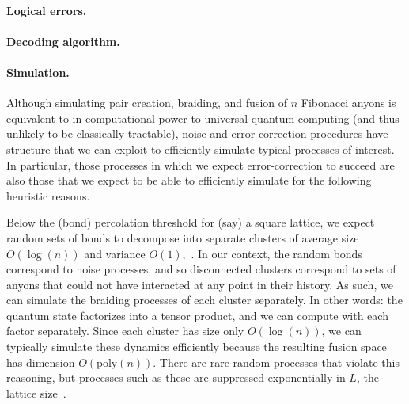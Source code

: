 \documentclass[aps, prl, letterpaper, twocolumn, superscriptaddress, notitlepage]{revtex4-1}
\begin{document}

\paragraph{Logical errors.}


\paragraph{Decoding algorithm.}



\paragraph{Simulation.}

Although simulating pair creation, braiding, and fusion of $n$ Fibonacci anyons is equivalent 
to in computational power to universal quantum computing (and thus unlikely to be classically 
tractable), noise and error-correction procedures have structure that we can exploit to 
efficiently simulate typical processes of interest. In particular, those processes in which we 
expect error-correction to succeed are also those that we expect to be able to efficiently 
simulate for the following heuristic reasons.

Below the (bond) percolation threshold for (say) a square lattice, we expect random sets of 
bonds to decompose into separate clusters of average size $O(\log(n))$ and variance 
$O(1)$,~\cite{Bazant2000}. In our context, the random bonds correspond to noise processes, 
and so disconnected clusters correspond to sets of anyons that could not have interacted at 
any point in their history. As such, we can simulate the braiding processes of each cluster 
separately. In other words: the quantum state factorizes into a tensor product, and we can 
compute with each factor separately. Since each cluster has size only $O(\log(n))$, we can 
typically simulate these dynamics efficiently because the resulting fusion space has 
dimension $O(\mathrm{poly}(n))$. There are rare random processes that violate this 
reasoning, but processes such as these are suppressed exponentially in $L$, the 
lattice size~\cite{Grimmett1989}. 
\end{document}
